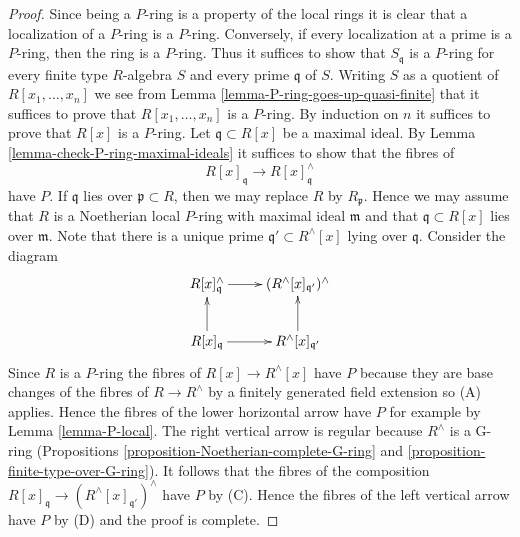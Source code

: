 \documentclass[10pt,a4paper]{amsart}
\theoremstyle{plain}
\theoremstyle{definition}
\theoremstyle{remark}
\numberwithin{equation}{subsection}
\begin{document}
\begin{proof}
Since being a $P$-ring is a property of the local rings it is clear
that a localization of a $P$-ring is a $P$-ring. Conversely, if every
localization at a prime is a $P$-ring, then the ring is a $P$-ring.
Thus it suffices to show that $S_\mathfrak q$ is a $P$-ring for every
finite type $R$-algebra $S$ and every prime $\mathfrak q$ of $S$.
Writing $S$ as a quotient of $R[x_1, \ldots, x_n]$ we see from
Lemma \ref{lemma-P-ring-goes-up-quasi-finite} that it suffices to prove
that $R[x_1, \ldots, x_n]$ is a $P$-ring. By induction on $n$ it
suffices to prove that $R[x]$ is a $P$-ring. Let $\mathfrak q \subset R[x]$
be a maximal ideal. By Lemma \ref{lemma-check-P-ring-maximal-ideals}
it suffices to show that the fibres of
$$
R[x]_\mathfrak q \longrightarrow R[x]_\mathfrak q^\wedge
$$
have $P$. If $\mathfrak q$ lies over $\mathfrak p \subset R$, then
we may replace $R$ by $R_\mathfrak p$. Hence we may assume that $R$
is a Noetherian local $P$-ring with maximal ideal $\mathfrak m$ and
that $\mathfrak q \subset R[x]$ lies over $\mathfrak m$. Note that
there is a unique prime $\mathfrak q' \subset R^\wedge[x]$
lying over $\mathfrak q$. Consider the diagram
$$
\xymatrix{
R[x]_\mathfrak q^\wedge \ar[r] &
(R^\wedge[x]_{\mathfrak q'})^\wedge \\
R[x]_\mathfrak q \ar[r] \ar[u] & R^\wedge[x]_{\mathfrak q'} \ar[u]
}
$$
Since $R$ is a $P$-ring the fibres of $R[x] \to R^\wedge[x]$ have
$P$ because they are base changes of the fibres of $R \to R^\wedge$
by a finitely generated field extension so (A) applies. Hence
the fibres of the lower horizontal arrow have $P$ for example by
Lemma \ref{lemma-P-local}.
The right vertical arrow is regular because $R^\wedge$ is
a G-ring (Propositions \ref{proposition-Noetherian-complete-G-ring} and
\ref{proposition-finite-type-over-G-ring}).
It follows that the fibres of the composition
$R[x]_\mathfrak q \to (R^\wedge[x]_{\mathfrak q'})^\wedge$
have $P$ by (C). Hence
the fibres of the left vertical arrow have $P$ by (D) and the
proof is complete.
\end{proof}
\end{document}

